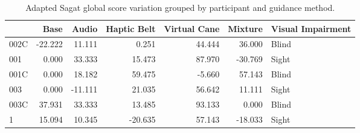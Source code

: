 
\begin{table}[!htb]
\centering
\caption{Adapted Sagat global score variation grouped by participant and guidance method.}
\label{tab:sagat_var}
\begin{tabular}{lrrrrrl}
\toprule
{} &    Base &   Audio &  Haptic Belt &  Virtual Cane &  Mixture & Visual Impairment \\
\midrule
002C & -22.222 &  11.111 &        0.251 &        44.444 &   36.000 &             Blind \\
001  &   0.000 &  33.333 &       15.473 &        87.970 &  -30.769 &             Sight \\
001C &   0.000 &  18.182 &       59.475 &        -5.660 &   57.143 &             Blind \\
003  &   0.000 & -11.111 &       21.035 &        56.642 &   11.111 &             Sight \\
003C &  37.931 &  33.333 &       13.485 &        93.133 &    0.000 &             Blind \\
1    &  15.094 &  10.345 &      -20.635 &        57.143 &  -18.033 &             Sight \\
\bottomrule
\end{tabular}
\end{table}

